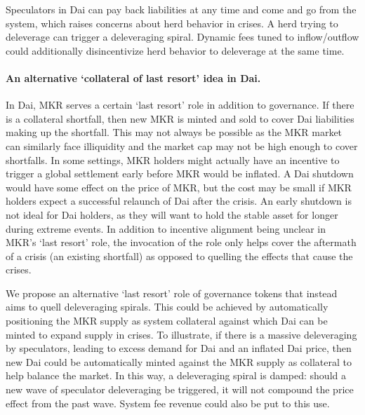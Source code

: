 Speculators in Dai can pay back liabilities at any time and come and go from the system, which raises concerns about herd behavior in crises. A herd trying to deleverage can trigger a deleveraging spiral. Dynamic fees tuned to inflow/outflow could additionally disincentivize herd behavior to deleverage at the same time.




\paragraph{An alternative `collateral of last resort' idea in Dai.}
In Dai, MKR serves a certain `last resort' role in addition to governance. If there is a collateral shortfall, then new MKR is minted and sold to cover Dai liabilities making up the shortfall. This may not always be possible as the MKR market can similarly face illiquidity and the market cap may not be high enough to cover shortfalls. In some settings, MKR holders might actually have an incentive to trigger a global settlement early before MKR would be inflated. A Dai shutdown would have some effect on the price of MKR, but the cost may be small if MKR holders expect a successful relaunch of Dai after the crisis. An early shutdown is not ideal for Dai holders, as they will want to hold the stable asset for longer during extreme events. In addition to incentive alignment being unclear in MKR's `last resort' role, the invocation of the role only helps cover the aftermath of a crisis (an existing shortfall) as opposed to quelling the effects that cause the crises.

We propose an alternative `last resort' role of governance tokens that instead aims to quell deleveraging spirals. This could be achieved by automatically positioning the MKR supply as system collateral against which Dai can be minted to expand supply in crises. To illustrate, if there is a massive deleveraging by speculators, leading to excess demand for Dai and an inflated Dai price, then new Dai could be automatically minted against the MKR supply as collateral to help balance the market. In this way, a deleveraging spiral is damped: should a new wave of speculator deleveraging be triggered, it will not compound the price effect from the past wave. System fee revenue could also be put to this use.



